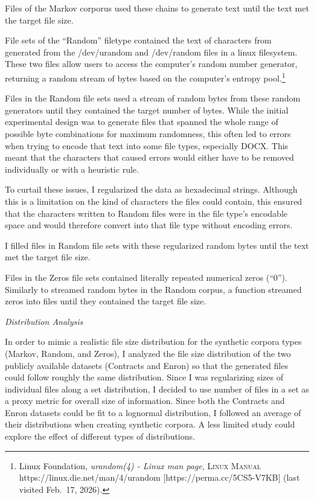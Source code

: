 \documentclass[
]{article}
\begin{document}
Files of the Markov corporus used these chains to generate text until
the text met the target file size.

File sets of the ``Random'' filetype contained the text of characters
from generated from the /dev/urandom and /dev/random files in a linux
filesystem. These two files allow users to access the computer's random
number generator, returning a random stream of bytes based on the
computer's entropy pool.\footnote{Linux Foundation, \emph{urandom(4) -
  Linux man page}, \textsc{Linux Manual}
  https://linux.die.net/man/4/urandom {[}https://perma.cc/5CS5-V7KB{]}
  (last visited Feb.~17, 2026).}

Files in the Random file sets used a stream of random bytes from these
random generators until they contained the target number of bytes. While
the initial experimental design was to generate files that spanned the
whole range of possible byte combinations for maximum randomness, this
often led to errors when trying to encode that text into some file
types, especially DOCX. This meant that the characters that caused
errors would either have to be removed individually or with a heuristic
rule.

To curtail these issues, I regularized the data as hexadecimal strings.
Although this is a limitation on the kind of characters the files could
contain, this ensured that the characters written to Random files were
in the file type's encodable space and would therefore convert into that
file type without encoding errors.

I filled files in Random file sets with these regularized random bytes
until the text met the target file size.

Files in the Zeros file sets contained literally repeated numerical
zeros (``0''). Similarly to streamed random bytes in the Random corpus,
a function streamed zeros into files until they contained the target
file size.

\emph{Distribution Analysis}

In order to mimic a realistic file size distribution for the synthetic
corpora types (Markov, Random, and Zeros), I analyzed the file size
distribution of the two publicly available datasets (Contracts and
Enron) so that the generated files could follow roughly the same
distribution. Since I was regularizing sizes of individual files along a
set distribution, I decided to use number of files in a set as a proxy
metric for overall size of information. Since both the Contracts and
Enron datasets could be fit to a lognormal distribution, I followed an
average of their distributions when creating synthetic corpora. A less
limited study could explore the effect of different types of
distributions.
\end{document}
